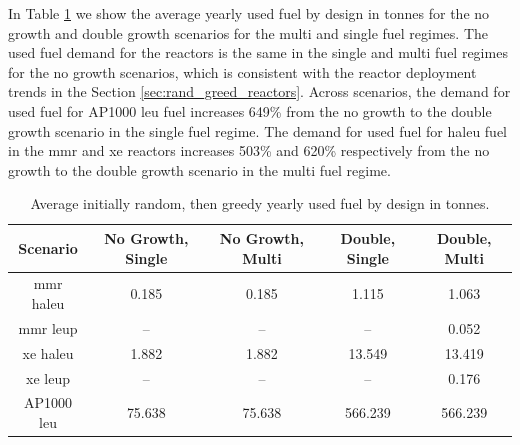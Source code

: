 In Table \ref{tab:rand_greed_used_avg} we show the average yearly used fuel by design in tonnes for the no growth and double growth scenarios for the multi and single fuel regimes. The used fuel demand for the reactors is the same in the single and multi fuel regimes for the no growth scenarios, which is consistent with the reactor deployment trends in the Section \ref{sec:rand_greed_reactors}. Across scenarios, the demand for used fuel for AP1000 \gls{leu} fuel increases 649\% from the no growth to the double growth scenario in the single fuel regime. The demand for used fuel for \gls{haleu} fuel in the \gls{mmr} and \gls{xe} reactors increases 503\% and 620\% respectively from the no growth to the double growth scenario in the multi fuel regime.

  \begin{table}[H]
    \centering
    \caption{Average initially random, then greedy yearly used fuel by design in tonnes.}
    \label{tab:rand_greed_used_avg}
    \begin{tabular}{c c c c c}
       \hline
       Scenario & No Growth, Single & No Growth, Multi & Double, Single & Double, Multi  \\
       \hline
       \gls{mmr} \gls{haleu}   & 0.185    & 0.185   & 1.115    & 1.063    \\
       \gls{mmr} \gls{leup}    & --       & --      & --       & 0.052    \\
       \gls{xe} \gls{haleu}    & 1.882    & 1.882   & 13.549   & 13.419   \\
       \gls{xe} \gls{leup}     & --       & --      & --       & 0.176    \\
       AP1000 \gls{leu}        & 75.638   & 75.638  & 566.239  & 566.239  \\
       \hline
    \end{tabular}
  \end{table}
